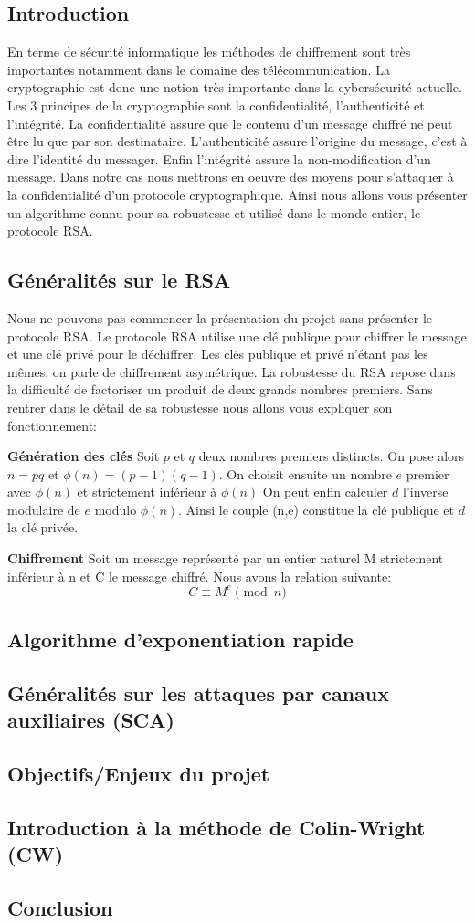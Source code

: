 \subsection{Introduction}
En terme de sécurité informatique les méthodes de chiffrement sont très importantes notamment dans le domaine des télécommunication. La cryptographie est donc une notion très importante dans la cybersécurité actuelle. Les 3 principes de la cryptographie sont la confidentialité, l'authenticité et l'intégrité.
La confidentialité assure que le contenu d'un message chiffré ne peut être lu que par son destinataire.
L'authenticité assure l'origine du message, c'est à dire l'identité du messager.
Enfin l'intégrité assure la non-modification d'un message.
Dans notre cas nous mettrons en oeuvre des moyens pour s'attaquer à la confidentialité d'un protocole cryptographique. 
Ainsi nous allons vous présenter un algorithme connu pour sa robustesse et utilisé dans le monde entier, le protocole RSA.
\subsection{Généralités sur le RSA}
Nous ne pouvons pas commencer la présentation du projet sans présenter le protocole RSA.
Le protocole RSA utilise une clé publique pour chiffrer le message et une clé privé pour le déchiffrer. Les clés publique et privé n'étant pas les mêmes, on parle de chiffrement asymétrique.
La robustesse du RSA repose dans la difficulté de factoriser un produit de deux grands nombres premiers.
Sans rentrer dans le détail de sa robustesse nous allons vous expliquer son fonctionnement:


\textbf{Génération des clés}
Soit $p$ et $q$ deux nombres premiers distincts. On pose alors $n=pq$ et $\phi(n)=(p-1)(q-1)$.
On choisit ensuite un nombre $e$ premier avec $\phi(n)$ et strictement inférieur à $\phi(n)$
On peut enfin calculer $d$ l'inverse modulaire de $e$ modulo $\phi(n)$.
Ainsi le couple (n,e) constitue la clé publique et $d$ la clé privée.


\textbf{Chiffrement}
Soit un message représenté par un entier naturel M strictement inférieur à n et C le message chiffré.
Nous avons la relation suivante:
\[
C \equiv M^e \pmod{n}
\]

\subsection{Algorithme d'exponentiation rapide}
\subsection{Généralités sur les attaques par canaux auxiliaires (SCA)}
\subsection{Objectifs/Enjeux du projet}
\subsection{Introduction à la méthode de Colin-Wright (CW)}
\subsection{Conclusion}